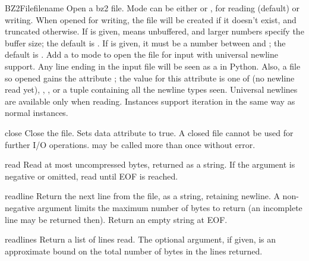 \begin{classdesc}{BZ2File}{filename}
Open a bz2 file. Mode can be either  or , for reading 
(default) or writing. When opened for writing, the file will be created if
it doesn't exist, and truncated otherwise. If  is given,
 means unbuffered, and larger numbers specify the buffer size;
the default is . If
 is given, it must be a number between  and
; the default is .
Add a  to mode to open the file for input with universal newline
support. Any line ending in the input file will be seen as a
 in Python.  Also, a file so opened gains the
attribute ; the value for this attribute is one of
 (no newline read yet), , ,
 or a tuple containing all the newline types
seen. Universal newlines are available only when reading.
Instances support iteration in the same way as normal 
instances.
\end{classdesc}

\begin{methoddesc}[BZ2File]{close}{}
Close the file. Sets data attribute  to true. A closed file
cannot be used for further I/O operations.  may be called
more than once without error.
\end{methoddesc}

\begin{methoddesc}[BZ2File]{read}{}
Read at most  uncompressed bytes, returned as a string. If the
 argument is negative or omitted, read until EOF is reached.
\end{methoddesc}

\begin{methoddesc}[BZ2File]{readline}{}
Return the next line from the file, as a string, retaining newline.
A non-negative  argument limits the maximum number of bytes to
return (an incomplete line may be returned then). Return an empty
string at EOF.
\end{methoddesc}

\begin{methoddesc}[BZ2File]{readlines}{}
Return a list of lines read. The optional  argument, if given,
is an approximate bound on the total number of bytes in the lines returned.
\end{methoddesc}

